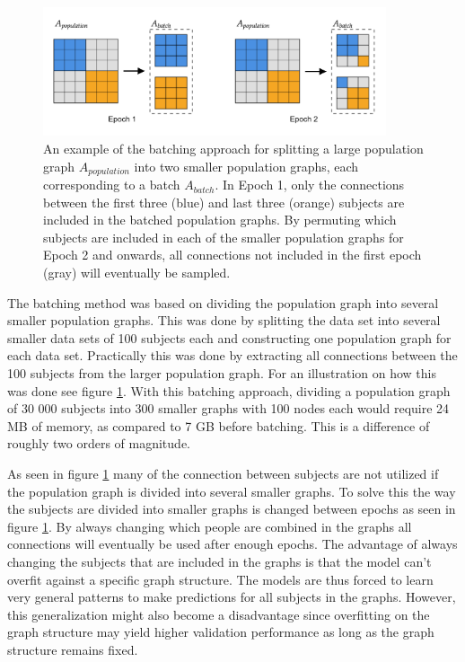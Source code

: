 \begin{figure}[H]
    \centering
    \includegraphics[width=0.9\textwidth]{chapters/images_methods/batches.png}
    \caption{An example of the batching approach for splitting a large population graph $A_{population}$ into two smaller population graphs, each corresponding to a batch $A_{batch}$. In Epoch 1, only the connections between the first three (blue) and last three (orange) subjects are included in the batched population graphs. By permuting which subjects are included in each of the smaller population graphs for Epoch 2 and onwards, all connections not included in the first epoch (gray) will eventually be sampled.}
    \label{fig:batches}
\end{figure}

The batching method was based on dividing the population graph into several smaller population graphs. This was done by splitting the data set into several smaller data sets of 100 subjects each and constructing one population graph for each data set. Practically this was done by extracting all connections between the 100 subjects from the larger population graph. For an illustration on how this was done see figure \ref{fig:batches}. With this batching approach, dividing a population graph of 30 000 subjects into 300 smaller graphs with 100 nodes each would require 24 MB of memory, as compared to 7 GB before batching. This is a difference of roughly two orders of magnitude.

As seen in figure \ref{fig:batches} many of the connection between subjects are not utilized if the population graph is divided into several smaller graphs. To solve this the way the subjects are divided into smaller graphs is changed between epochs as seen in figure \ref{fig:batches}. By always changing which people are combined in the graphs all connections will eventually be used after enough epochs. The advantage of always changing the subjects that are included in the graphs is that the model can't overfit against a specific graph structure. The models are thus forced to learn very general patterns to make predictions for all subjects in the graphs. However, this generalization might also become a disadvantage since overfitting on the graph structure may yield higher validation performance as long as the graph structure remains fixed. 


